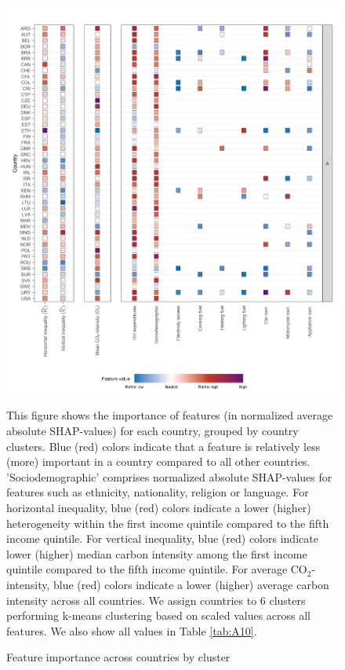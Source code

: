 \documentclass[12pt, a4paper]{article}
\newenvironment{subcaption2}
{\strut
\vspace{-5pt}
\begin{minipage}[b]{0.9\textwidth}
  \hspace*{-\parindent}
  \footnotesize}
 {\end{minipage}}
\begin{document}
\begin{figure}[ht!]
    \centering
    \includegraphics{1_Figures/Figure 4/Figure_4_Corrected_1.jpg}
    \caption{Feature importance across countries by cluster}
    \label{fig:fig_4_1}
    \begin{subcaption2}
    This figure shows the importance of features (in normalized average absolute SHAP-values) for each country, grouped by country clusters. Blue (red) colors indicate that a feature is relatively less (more) important in a country compared to all other countries. 'Sociodemographic' comprises normalized absolute SHAP-values for features such as ethnicity, nationality, religion or language.
    For horizontal inequality, blue (red) colors indicate a lower (higher) heterogeneity within the first income quintile compared to the fifth income quintile. For vertical inequality, blue (red) colors indicate lower (higher) median carbon intensity among the first income quintile compared to the fifth income quintile. For average CO$_{2}$-intensity, blue (red) colors indicate a lower (higher) average carbon intensity across all countries.
    We assign countries to 6 clusters performing k-means clustering based on scaled values across all features. We also show all values in Table \ref{tab:A10}.
    \end{subcaption2}
\end{figure}
\end{document}
